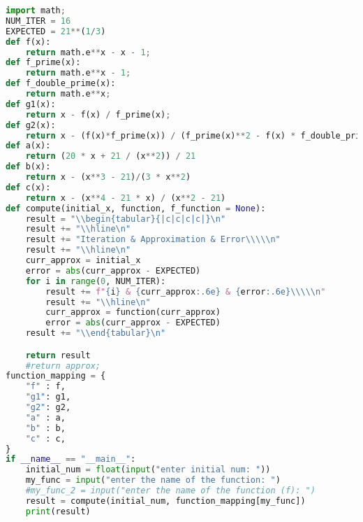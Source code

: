 \documentclass{article}
\begin{document}
\begin{enumerate}
\begin{lstlisting}[language=Python]
import math;
NUM_ITER = 16
EXPECTED = 21**(1/3)
def f(x):
    return math.e**x - x - 1;
def f_prime(x):
    return math.e**x - 1;
def f_double_prime(x):
    return math.e**x;
def g1(x):
    return x - f(x) / f_prime(x);
def g2(x):
    return x - (f(x)*f_prime(x)) / (f_prime(x)**2 - f(x) * f_double_prime(x))
def a(x):
    return (20 * x + 21 / (x**2)) / 21
def b(x):
    return x - (x**3 - 21)/(3 * x**2)
def c(x):
    return x - (x**4 - 21 * x) / (x**2 - 21)
def compute(initial_x, function, f_function = None):
    result = "\\begin{tabular}{|c|c|c|c|}\n"
    result += "\\hline\n"
    result += "Iteration & Approximation & Error\\\\\n"
    result += "\\hline\n"
    curr_approx = initial_x
    error = abs(curr_approx - EXPECTED)
    for i in range(0, NUM_ITER):
        result += f"{i} & {curr_approx:.6e} & {error:.6e}\\\\\n"
        result += "\\hline\n"
        curr_approx = function(curr_approx)
        error = abs(curr_approx - EXPECTED)
    result += "\\end{tabular}\n"

    return result
    #return approx;
function_mapping = {
    "f" : f,
    "g1": g1,
    "g2": g2,
    "a" : a,
    "b" : b,
    "c" : c,
}
if __name__ == "__main__":
    initial_num = float(input("enter initial num: "))
    my_func = input("enter the name of the function: ")
    #my_func_2 = input("enter the name of the function (f): ")
    result = compute(initial_num, function_mapping[my_func])
    print(result)
\end{lstlisting}
\end{enumerate}
\end{document}
